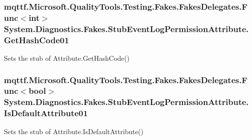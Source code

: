 \hypertarget{class_system_1_1_diagnostics_1_1_fakes_1_1_stub_event_log_permission_attribute_acfa363f1b6ff105895eb9f60ed718c77}{
\subsubsection[{Get\-Hash\-Code01}]{\setlength{\rightskip}{0pt plus 5cm}mqttf.\-Microsoft.\-Quality\-Tools.\-Testing.\-Fakes.\-Fakes\-Delegates.\-Func$<$int$>$ System.\-Diagnostics.\-Fakes.\-Stub\-Event\-Log\-Permission\-Attribute.\-Get\-Hash\-Code01}}\label{class_system_1_1_diagnostics_1_1_fakes_1_1_stub_event_log_permission_attribute_acfa363f1b6ff105895eb9f60ed718c77}


Sets the stub of Attribute.\-Get\-Hash\-Code()

\hypertarget{class_system_1_1_diagnostics_1_1_fakes_1_1_stub_event_log_permission_attribute_a76ec468c59af18365d8ef46d4b1a537d}{
\subsubsection[{Is\-Default\-Attribute01}]{\setlength{\rightskip}{0pt plus 5cm}mqttf.\-Microsoft.\-Quality\-Tools.\-Testing.\-Fakes.\-Fakes\-Delegates.\-Func$<$bool$>$ System.\-Diagnostics.\-Fakes.\-Stub\-Event\-Log\-Permission\-Attribute.\-Is\-Default\-Attribute01}}\label{class_system_1_1_diagnostics_1_1_fakes_1_1_stub_event_log_permission_attribute_a76ec468c59af18365d8ef46d4b1a537d}


Sets the stub of Attribute.\-Is\-Default\-Attribute()


